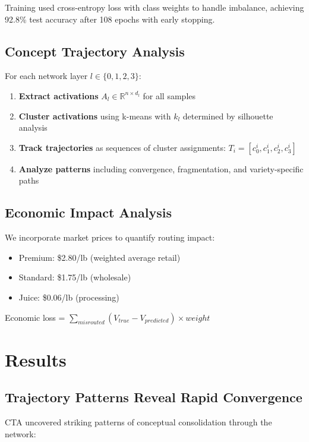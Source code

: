 \documentclass[11pt,a4paper]{article}
\begin{document}
Training used cross-entropy loss with class weights to handle imbalance, achieving 92.8\% test accuracy after 108 epochs with early stopping.

\subsection{Concept Trajectory Analysis}

For each network layer $l \in \{0,1,2,3\}$:

\begin{enumerate}
    \item \textbf{Extract activations} $A_l \in \mathbb{R}^{n \times d_l}$ for all samples
    \item \textbf{Cluster activations} using k-means with $k_l$ determined by silhouette analysis
    \item \textbf{Track trajectories} as sequences of cluster assignments: $T_i = [c_0^i, c_1^i, c_2^i, c_3^i]$
    \item \textbf{Analyze patterns} including convergence, fragmentation, and variety-specific paths
\end{enumerate}

\subsection{Economic Impact Analysis}

We incorporate market prices to quantify routing impact:
\begin{itemize}
    \item Premium: \$2.80/lb (weighted average retail)
    \item Standard: \$1.75/lb (wholesale)  
    \item Juice: \$0.06/lb (processing)
\end{itemize}

Economic loss = $\sum_{misrouted} (V_{true} - V_{predicted}) \times weight$

\section{Results}

\subsection{Trajectory Patterns Reveal Rapid Convergence}

CTA uncovered striking patterns of conceptual consolidation through the network:
\end{document}
